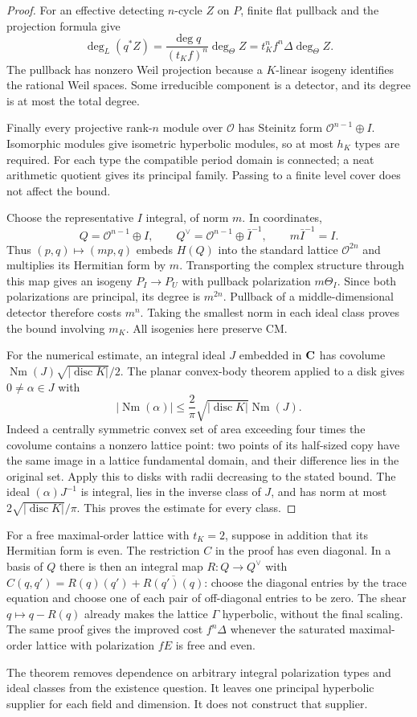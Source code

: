 \begin{proof}
For an effective detecting $n$-cycle $Z$ on $P$, finite flat pullback and the projection formula give
\[
 \deg_L(q^*Z)=\frac{\deg q}{(t_K f)^n}\deg_\Theta Z
             =t_K^n f^n\Delta\deg_\Theta Z.
\]
The pullback has nonzero Weil projection because a $K$-linear isogeny identifies the rational Weil spaces. Some irreducible component is a detector, and its degree is at most the total degree.

Finally every projective rank-$n$ module over $\mathcal O$ has Steinitz form $\mathcal O^{n-1}\oplus I$. Isomorphic modules give isometric hyperbolic modules, so at most $h_K$ types are required. For each type the compatible period domain is connected; a neat arithmetic quotient gives its principal family. Passing to a finite level cover does not affect the bound.

Choose the representative $I$ integral, of norm $m$. In coordinates,
\[
 Q=\mathcal O^{n-1}\oplus I,
 \qquad Q^\vee=\mathcal O^{n-1}\oplus\bar I^{-1},
 \qquad m\bar I^{-1}=I.
\]
Thus $(p,q)\mapsto(mp,q)$ embeds $H(Q)$ into the standard lattice $\mathcal O^{2n}$ and multiplies its Hermitian form by $m$. Transporting the complex structure through this map gives an isogeny $P_I\to P_U$ with pullback polarization $m\Theta_I$. Since both polarizations are principal, its degree is $m^{2n}$. Pullback of a middle-dimensional detector therefore costs $m^n$. Taking the smallest norm in each ideal class proves the bound involving $m_K$. All isogenies here preserve CM.

For the numerical estimate, an integral ideal $J$ embedded in $\mathbf C$ has covolume $\operatorname{Nm}(J)\sqrt{|\operatorname{disc}K|}/2$. The planar convex-body theorem applied to a disk gives $0\ne\alpha\in J$ with
\[
 |\operatorname{Nm}(\alpha)|\le
 \frac2\pi\sqrt{|\operatorname{disc}K|}\operatorname{Nm}(J).
\]
Indeed a centrally symmetric convex set of area exceeding four times the covolume contains a nonzero lattice point: two points of its half-sized copy have the same image in a lattice fundamental domain, and their difference lies in the original set. Apply this to disks with radii decreasing to the stated bound. The ideal $(\alpha)J^{-1}$ is integral, lies in the inverse class of $J$, and has norm at most $2\sqrt{|\operatorname{disc}K|}/\pi$. This proves the estimate for every class.
\end{proof}

For a free maximal-order lattice with $t_K=2$, suppose in addition that its Hermitian form is even. The restriction $C$ in the proof has even diagonal. In a basis of $Q$ there is then an integral map $R:Q\to Q^\vee$ with $C(q,q')=R(q)(q')+\overline{R(q')(q)}$: choose the diagonal entries by the trace equation and choose one of each pair of off-diagonal entries to be zero. The shear $q\mapsto q-R(q)$ already makes the lattice $\Gamma$ hyperbolic, without the final scaling. The same proof gives the improved cost $f^n\Delta$ whenever the saturated maximal-order lattice with polarization $fE$ is free and even.

The theorem removes dependence on arbitrary integral polarization types and ideal classes from the existence question. It leaves one principal hyperbolic supplier for each field and dimension. It does not construct that supplier.
